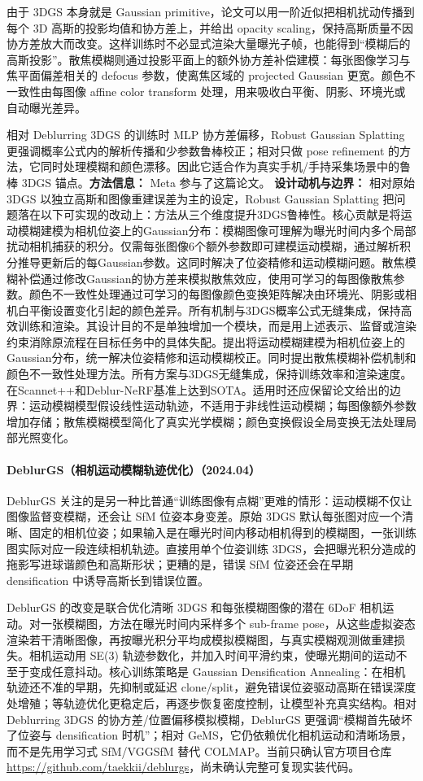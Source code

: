 由于 3DGS 本身就是 Gaussian primitive，论文可以用一阶近似把相机扰动传播到每个 3D 高斯的投影均值和协方差上，并给出 opacity scaling，保持高斯质量不因协方差放大而改变。这样训练时不必显式渲染大量曝光子帧，也能得到“模糊后的高斯投影”。散焦模糊则通过投影平面上的额外协方差补偿建模：每张图像学习与焦平面偏差相关的 defocus 参数，使离焦区域的 projected Gaussian 更宽。颜色不一致性由每图像 affine color transform 处理，用来吸收白平衡、阴影、环境光或自动曝光差异。

相对 Deblurring 3DGS 的训练时 MLP 协方差偏移，Robust Gaussian Splatting 更强调概率公式内的解析传播和少参数鲁棒校正；相对只做 pose refinement 的方法，它同时处理模糊和颜色漂移。因此它适合作为真实手机/手持采集场景中的鲁棒 3DGS 锚点。\textbf{方法信息：} Meta 参与了这篇论文。
\textbf{设计动机与边界：} 相对原始 3DGS 以独立高斯和图像重建误差为主的设定，Robust Gaussian Splatting 把问题落在以下可实现的改动上：方法从三个维度提升3DGS鲁棒性。核心贡献是将运动模糊建模为相机位姿上的Gaussian分布：模糊图像可理解为曝光时间内多个局部扰动相机捕获的积分。仅需每张图像6个额外参数即可建模运动模糊，通过解析积分推导更新后的每Gaussian参数。这同时解决了位姿精修和运动模糊问题。散焦模糊补偿通过修改Gaussian的协方差来模拟散焦效应，使用可学习的每图像散焦参数。颜色不一致性处理通过可学习的每图像颜色变换矩阵解决由环境光、阴影或相机白平衡设置变化引起的颜色差异。所有机制与3DGS概率公式无缝集成，保持高效训练和渲染。其设计目的不是单独增加一个模块，而是用上述表示、监督或渲染约束消除原流程在目标任务中的具体失配。提出将运动模糊建模为相机位姿上的Gaussian分布，统一解决位姿精修和运动模糊校正。同时提出散焦模糊补偿机制和颜色不一致性处理方法。所有方案与3DGS无缝集成，保持训练效率和渲染速度。在Scannet++和Deblur-NeRF基准上达到SOTA。适用时还应保留论文给出的边界：运动模糊模型假设线性运动轨迹，不适用于非线性运动模糊；每图像额外参数增加存储；散焦模糊模型简化了真实光学模糊；颜色变换假设全局变换无法处理局部光照变化。
\paragraph{DeblurGS（相机运动模糊轨迹优化）（2024.04）\cite{2404_11358}}
DeblurGS 关注的是另一种比普通“训练图像有点糊”更难的情形：运动模糊不仅让图像监督变模糊，还会让 SfM 位姿本身变差。原始 3DGS 默认每张图对应一个清晰、固定的相机位姿；如果输入是在曝光时间内移动相机得到的模糊图，一张训练图实际对应一段连续相机轨迹。直接用单个位姿训练 3DGS，会把曝光积分造成的拖影写进球谐颜色和高斯形状；更糟的是，错误 SfM 位姿还会在早期 densification 中诱导高斯长到错误位置。

DeblurGS 的改变是联合优化清晰 3DGS 和每张模糊图像的潜在 6DoF 相机运动。对一张模糊图，方法在曝光时间内采样多个 sub-frame pose，从这些虚拟姿态渲染若干清晰图像，再按曝光积分平均成模拟模糊图，与真实模糊观测做重建损失。相机运动用 SE(3) 轨迹参数化，并加入时间平滑约束，使曝光期间的运动不至于变成任意抖动。核心训练策略是 Gaussian Densification Annealing：在相机轨迹还不准的早期，先抑制或延迟 clone/split，避免错误位姿驱动高斯在错误深度处增殖；等轨迹优化更稳定后，再逐步恢复密度控制，让模型补充真实结构。相对 Deblurring 3DGS 的协方差/位置偏移模拟模糊，DeblurGS 更强调“模糊首先破坏了位姿与 densification 时机”；相对 GeMS，它仍依赖优化相机运动和清晰场景，而不是先用学习式 SfM/VGGSfM 替代 COLMAP。当前只确认官方项目仓库 \url{https://github.com/taekkii/deblurgs}，尚未确认完整可复现实装代码。


